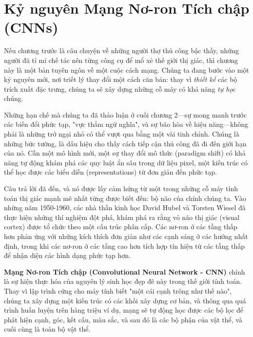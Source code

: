 \chapter{Kỷ nguyên Mạng Nơ-ron Tích chập (CNNs)}
\label{chap:cnn_era}

Nếu chương trước là câu chuyện về những người thợ thủ công bậc thầy, những người đã tỉ mỉ chế tác nên từng công cụ để mổ xẻ thế giới thị giác, thì chương này là một bản tuyên ngôn về một cuộc cách mạng. Chúng ta đang bước vào một kỷ nguyên mới, nơi triết lý thay đổi một cách căn bản: thay vì \textit{thiết kế} các bộ trích xuất đặc trưng, chúng ta sẽ xây dựng những cỗ máy có khả năng \textit{tự học} chúng.

Những hạn chế mà chúng ta đã thảo luận ở cuối chương 2—sự mong manh trước các biến đổi phức tạp, "vực thẳm ngữ nghĩa", và sự bão hòa về hiệu năng—không phải là những trở ngại nhỏ có thể vượt qua bằng một vài tinh chỉnh. Chúng là những bức tường, là dấu hiệu cho thấy cách tiếp cận thủ công đã đi đến giới hạn của nó. Cần một mô hình mới, một sự thay đổi mô thức (paradigm shift) có khả năng tự động khám phá các quy luật ẩn sâu trong dữ liệu pixel, một kiến trúc có thể học được các biểu diễn (representations) từ đơn giản đến phức tạp.

Câu trả lời đã đến, và nó được lấy cảm hứng từ một trong những cỗ máy tính toán thị giác mạnh mẽ nhất từng được biết đến: bộ não của chính chúng ta. Vào những năm 1950-1960, các nhà thần kinh học David Hubel và Torsten Wiesel đã thực hiện những thí nghiệm đột phá, khám phá ra rằng vỏ não thị giác (visual cortex) được tổ chức theo một cấu trúc phân cấp. Các nơ-ron ở các tầng thấp hơn phản ứng với những kích thích đơn giản như các cạnh sáng ở các hướng nhất định, trong khi các nơ-ron ở các tầng cao hơn tích hợp tín hiệu từ các tầng thấp để nhận diện các hình dạng phức tạp hơn.

\textbf{Mạng Nơ-ron Tích chập (Convolutional Neural Network - CNN)} chính là sự hiện thực hóa của nguyên lý sinh học đẹp đẽ này trong thế giới tính toán. Thay vì lập trình cứng cho máy tính biết "một cái cạnh trông như thế nào", chúng ta xây dựng một kiến trúc có các khối xây dựng cơ bản, và thông qua quá trình huấn luyện trên hàng triệu ví dụ, mạng sẽ tự động học được các bộ lọc để phát hiện cạnh, góc, kết cấu, màu sắc, và sau đó là các bộ phận của vật thể, và cuối cùng là toàn bộ vật thể.

